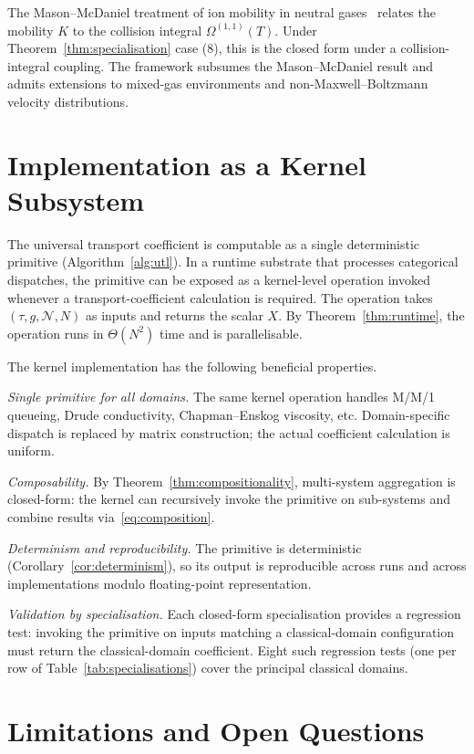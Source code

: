 \documentclass[twocolumn,11pt,a4paper]{article}
\newcommand{\TP}{X}
\newcommand{\Norm}{\mathcal{N}}
\newcommand{\lag}{\tau}
\newcommand{\cpl}{g}
\newcommand{\classcount}{N}
\begin{document}
The Mason--McDaniel treatment of ion mobility in neutral gases~\citep{mason1988transport} relates the mobility $K$ to the collision integral $\Omega^{(1,1)}(T)$. Under Theorem~\ref{thm:specialisation} case (8), this is the closed form under a collision-integral coupling. The framework subsumes the Mason--McDaniel result and admits extensions to mixed-gas environments and non-Maxwell--Boltzmann velocity distributions.

\section{Implementation as a Kernel Subsystem}
\label{sec:kernel}

The universal transport coefficient is computable as a single deterministic primitive (Algorithm~\ref{alg:utl}). In a runtime substrate that processes categorical dispatches, the primitive can be exposed as a kernel-level operation invoked whenever a transport-coefficient calculation is required. The operation takes $(\lag, \cpl, \Norm, \classcount)$ as inputs and returns the scalar $\TP$. By Theorem~\ref{thm:runtime}, the operation runs in $\Theta(\classcount^2)$ time and is parallelisable.

The kernel implementation has the following beneficial properties.

\emph{Single primitive for all domains.} The same kernel operation handles M/M/1 queueing, Drude conductivity, Chapman--Enskog viscosity, etc. Domain-specific dispatch is replaced by matrix construction; the actual coefficient calculation is uniform.

\emph{Composability.} By Theorem~\ref{thm:compositionality}, multi-system aggregation is closed-form: the kernel can recursively invoke the primitive on sub-systems and combine results via~\eqref{eq:composition}.

\emph{Determinism and reproducibility.} The primitive is deterministic (Corollary~\ref{cor:determinism}), so its output is reproducible across runs and across implementations modulo floating-point representation.

\emph{Validation by specialisation.} Each closed-form specialisation provides a regression test: invoking the primitive on inputs matching a classical-domain configuration must return the classical-domain coefficient. Eight such regression tests (one per row of Table~\ref{tab:specialisations}) cover the principal classical domains.

\section{Limitations and Open Questions}
\label{sec:limitations}
\end{document}
